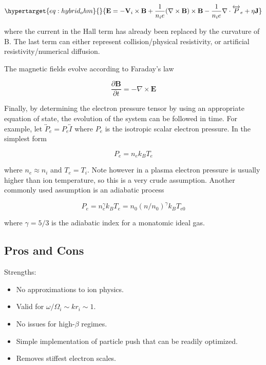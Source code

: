 \documentclass[
  notoc %
]{tufte-book}
\providecommand{\tightlist}{%
  \setlength{\itemsep}{0pt}\setlength{\parskip}{0pt}
}
\begin{document}
\begin{equation}\protect\hypertarget{eq:hybrid_ohm}{}{
\mathbf{E} = - \mathbf{V}_i \times \mathbf{B} + \frac{1}{n_i e}(\nabla\times\mathbf{B})\times\mathbf{B} - \frac{1}{n_i e}\nabla\cdot\overleftrightarrow{P}_e + \eta \mathbf{J}
}\label{eq:hybrid_ohm}\end{equation}

where the current in the Hall term has already been replaced by the
curvature of B. The last term can either represent collision/physical
resistivity, or artificial resistivity/numerical diffusion.

The magnetic fields evolve according to Faraday's law

\[
\frac{\partial \mathbf{B}}{\partial t} = -\nabla\times\mathbf{E}
\]

Finally, by determining the electron pressure tensor by using an
appropriate equation of state, the evolution of the system can be
followed in time. For example, let
\(\overleftrightarrow{P}_e = P_e \overleftrightarrow{I}\) where \(P_e\)
is the isotropic scalar electron pressure. In the simplest form

\[
P_e = n_e k_B T_e
\]

where \(n_e \approx n_i\) and \(T_e=T_i\). Note however in a plasma
electron pressure is usually higher than ion temperature, so this is a
very crude assumption. Another commonly used assumption is an adiabatic
process

\[
P_e = n_e^\gamma k_B T_e = n_0(n/n_0)^\gamma k_B T_{e0}
\]

where \(\gamma=5/3\) is the adiabatic index for a monatomic ideal gas.

\hypertarget{pros-and-cons}{%
\subsection{Pros and Cons}\label{pros-and-cons}}

Strengths:

\begin{itemize}
\tightlist
\item
  No approximations to ion physics.
\item
  Valid for \(\omega/\Omega_i \sim kr_i \sim 1\).
\item
  No issues for high-\(\beta\) regimes.
\item
  Simple implementation of particle push that can be readily optimized.
\item
  Removes stiffest electron scales.
\end{itemize}
\end{document}
